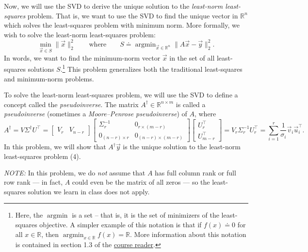 \documentclass[10pt]{article}
\theoremstyle{definition}
\theoremstyle{plain}
\newcommand{\RR}{\mathbb{R}}
\DeclareMathOperator{\argmin}{argmin}
\begin{document}
Now, we will use the SVD to derive the unique solution to the \textit{least-norm least-squares} problem. That is, we want to use the SVD to find the unique vector in $\RR^n$ which solves the least-squares problem with minimum norm. More formally, we wish to solve the least-norm least-squares problem:
\begin{equation}
\min_{\vec{x} \in S} \|\vec{x}\|_2^2 \qquad \text{where} \qquad S \doteq \argmin_{\vec{x} \in \RR^n} \|A\vec{x} - \vec{y}\|_2^2.
\end{equation}
In words, we want to find the minimum-norm vector $\vec{x}$ in the set of all least-squares solutions $S$.\footnote{Here, the $\argmin$ is a set -- that is, it is the set of minimizers of the least-squares objective. A simpler example of this notation is that if $f(x) \doteq 0$ for all $x \in \RR$, then $\argmin_{x \in \RR} f(x) = \RR$. More information about this notation is contained in section 1.3 of the \href{https://eecs127.github.io/}{course reader}.} This problem generalizes both the traditional least-squares and minimum-norm problems.

To solve the least-norm least-squares problem, we will use the SVD to define a concept called the \textit{pseudoinverse}. The matrix $A^\dagger \in \RR^{n \times m}$ is called a \textit{pseudoinverse} (sometimes a \textit{Moore--Penrose pseudoinverse}) of $A$, where
\begin{equation}
A^\dagger = V\Sigma^\dagger U^\top = \begin{bmatrix} V_r & V_{n-r} \end{bmatrix}
\begin{bmatrix} \Sigma_r^{-1} & 0_{r \times (m-r)} \\ 0_{(n-r) \times r} & 0_{(n-r) \times (m-r)} \end{bmatrix}
\begin{bmatrix} U_r^\top \\ U_{m-r}^\top \end{bmatrix}
= V_r \Sigma_r^{-1} U_r^\top = \sum_{i=1}^{r} \frac{1}{\sigma_i} \vec{v}_i \vec{u}_i^\top.
\end{equation}
In this problem, we will show that $A^\dagger \vec{y}$ is the unique solution to the least-norm least-squares problem (4).

\textit{NOTE:} In this problem, we do \textit{not} assume that $A$ has full column rank or full row rank --- in fact, $A$ could even be the matrix of all zeros --- so the least-squares solution we learn in class does not apply.
\end{document}
